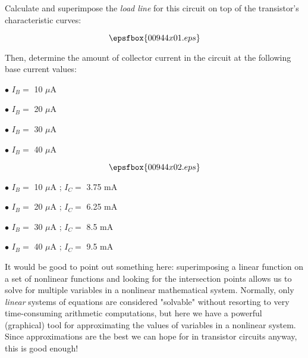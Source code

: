 

Calculate and superimpose the {\it load line} for this circuit on top of the transistor's characteristic curves:

$$\epsfbox{00944x01.eps}$$

Then, determine the amount of collector current in the circuit at the following base current values:

\medskip
\item{$\bullet$} $I_B =$ 10 $\mu$A
\item{$\bullet$} $I_B =$ 20 $\mu$A
\item{$\bullet$} $I_B =$ 30 $\mu$A
\item{$\bullet$} $I_B =$ 40 $\mu$A
\medskip







$$\epsfbox{00944x02.eps}$$

\medskip
\item{$\bullet$} $I_B =$ 10 $\mu$A ; $I_C =$ 3.75 mA 
\item{$\bullet$} $I_B =$ 20 $\mu$A ; $I_C =$ 6.25 mA
\item{$\bullet$} $I_B =$ 30 $\mu$A ; $I_C =$ 8.5 mA
\item{$\bullet$} $I_B =$ 40 $\mu$A ; $I_C =$ 9.5 mA
\medskip







It would be good to point out something here: superimposing a linear function on a set of nonlinear functions and looking for the intersection points allows us to solve for multiple variables in a nonlinear mathematical system.  Normally, only {\it linear} systems of equations are considered "solvable" without resorting to very time-consuming arithmetic computations, but here we have a powerful (graphical) tool for approximating the values of variables in a nonlinear system.  Since approximations are the best we can hope for in transistor circuits anyway, this is good enough!




